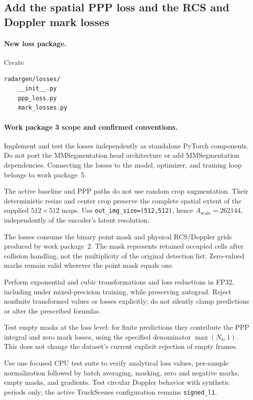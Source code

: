 \documentclass[11pt,a4paper]{article}
\begin{document}
\subsection{Add the spatial PPP loss and the RCS and Doppler mark losses}

\paragraph{New loss package.}
Create
\begin{lstlisting}
radargen/losses/
    __init__.py
    ppp_loss.py
    mark_losses.py
\end{lstlisting}

\paragraph{Work package 3 scope and confirmed conventions.}
Implement and test the losses independently as standalone PyTorch
components. Do not port the MMSegmentation head architecture or add
MMSegmentation dependencies. Connecting the losses to the model,
optimizer, and training loop belongs to work package~5.

The active baseline and PPP paths do not use random crop augmentation.
Their deterministic resize and center crop preserve the complete
spatial extent of the supplied \(512\times512\) maps.
Use \texttt{out\_img\_size=(512,512)}, hence
\(A_{\mathrm{scale}}=262144\), independently of the encoder's latent
resolution.

The losses consume the binary point mask and physical RCS/Doppler
grids produced by work package~2. The mask represents retained
occupied cells after collision handling, not the multiplicity of
the original detection list. Zero-valued marks remain valid wherever
the point mask equals one.

Perform exponential and cubic transformations and loss reductions
in FP32, including under mixed-precision training, while preserving
autograd. Reject nonfinite transformed values or losses explicitly;
do not silently clamp predictions or alter the prescribed formulas.

Test empty masks at the loss level: for finite predictions they
contribute the PPP integral and zero mark losses, using the specified
denominator \(\max(N_b,1)\). This does not change the dataset's current
explicit rejection of empty frames.

Use one focused CPU test suite to verify analytical loss values,
per-sample normalization followed by batch averaging, masking,
zero and negative marks, empty masks, and gradients.
Test circular Doppler behavior with synthetic periods only;
the active TruckScenes configuration remains \texttt{signed\_l1}.
\end{document}
